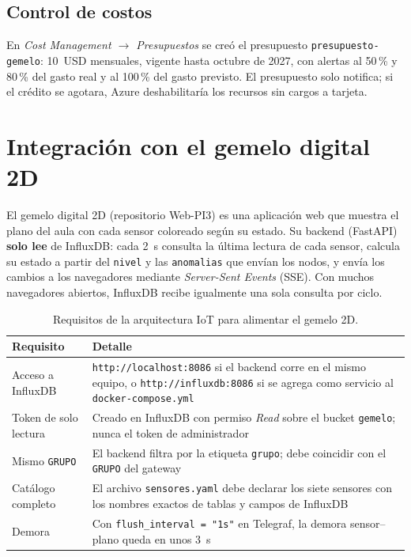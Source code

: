 \documentclass[11pt,a4paper]{article}
\newcommand{\arch}[1]{\texttt{#1}}
\begin{document}
\subsection{Control de costos}

En \emph{Cost Management $\rightarrow$ Presupuestos} se cre\'o el presupuesto
\texttt{presupuesto-gemelo}: 10~USD mensuales, vigente hasta octubre de 2027, con alertas al
50\,\% y 80\,\% del gasto real y al 100\,\% del gasto previsto. El presupuesto solo notifica;
si el cr\'edito se agotara, Azure deshabilitar\'ia los recursos sin cargos a tarjeta.

\section{Integraci\'on con el gemelo digital 2D}

El gemelo digital 2D (repositorio Web-PI3) es una aplicaci\'on web que muestra el plano del aula
con cada sensor coloreado seg\'un su estado. Su backend (FastAPI) \textbf{solo lee} de InfluxDB:
cada 2~s consulta la \'ultima lectura de cada sensor, calcula su estado a partir del \texttt{nivel}
y las \texttt{anomalias} que env\'ian los nodos, y env\'ia los cambios a los navegadores mediante
\emph{Server-Sent Events} (SSE). Con muchos navegadores abiertos, InfluxDB recibe igualmente una
sola consulta por ciclo.

\begin{table}[H]
\centering
\caption{Requisitos de la arquitectura IoT para alimentar el gemelo 2D.}
\begin{tabularx}{\textwidth}{@{}lX@{}}
\toprule
\textbf{Requisito} & \textbf{Detalle} \\
\midrule
Acceso a InfluxDB & \texttt{http://localhost:8086} si el backend corre en el mismo equipo, o
\texttt{http://influxdb:8086} si se agrega como servicio al \arch{docker-compose.yml} \\
Token de solo lectura & Creado en InfluxDB con permiso \emph{Read} sobre el bucket \texttt{gemelo};
nunca el token de administrador \\
Mismo \texttt{GRUPO} & El backend filtra por la etiqueta \texttt{grupo}; debe coincidir con el
\texttt{GRUPO} del gateway \\
Cat\'alogo completo & El archivo \arch{sensores.yaml} debe declarar los siete sensores con los
nombres exactos de tablas y campos de InfluxDB \\
Demora & Con \texttt{flush\_interval = "1s"} en Telegraf, la demora sensor--plano queda en unos 3~s \\
\bottomrule
\end{tabularx}
\end{table}
\end{document}
